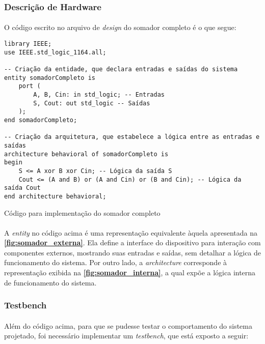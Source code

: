 \documentclass[a4paper,12pt]{article}
\newenvironment{code}{\captionsetup{type=listing}}{}
\begin{document}
\subsubsection{Descrição de Hardware}
\paragraph{}
O código escrito no arquivo de \textit{design} do somador completo é o que segue:

\begin{code}
\begin{verbatim}
library IEEE;
use IEEE.std_logic_1164.all;

-- Criação da entidade, que declara entradas e saídas do sistema
entity somadorCompleto is
    port (
        A, B, Cin: in std_logic; -- Entradas
        S, Cout: out std_logic -- Saídas
    );
end somadorCompleto;

-- Criação da arquitetura, que estabelece a lógica entre as entradas e saídas
architecture behavioral of somadorCompleto is
begin
    S <= A xor B xor Cin; -- Lógica da saída S
    Cout <= (A and B) or (A and Cin) or (B and Cin); -- Lógica da saída Cout
end architecture behavioral;
\end{verbatim}
\caption{Código para implementação do somador completo}
\end{code}

\paragraph{}
A \textit{entity} no código acima é uma representação equivalente àquela apresentada na \textbf{\autoref{fig:somador_externa}}. Ela define a interface do dispositivo para interação com componentes externos, mostrando suas entradas e saídas, sem detalhar a lógica de funcionamento do sistema. Por outro lado, a \textit{architecture} corresponde à representação exibida na \textbf{\autoref{fig:somador_interna}}, a qual expõe a lógica interna de funcionamento do sistema.

\newpage

\subsubsection{Testbench}
\paragraph{}
Além do código acima, para que se pudesse testar o comportamento do sistema projetado, foi necessário implementar um \textit{testbench}, que está exposto a seguir:
\end{document}
